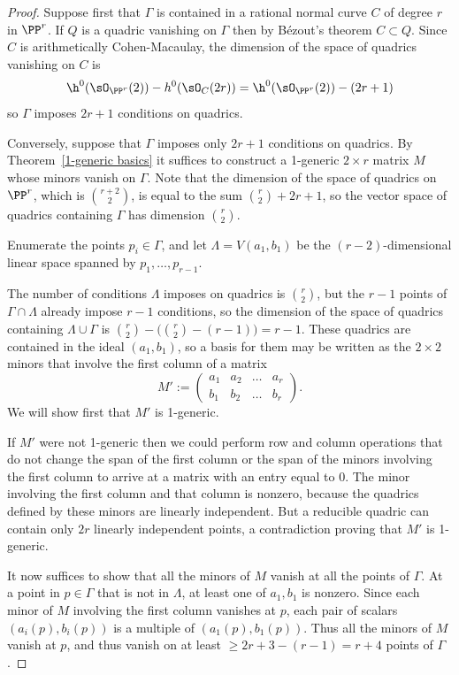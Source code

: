 \begin{proof} Suppose first that $\Gamma$ is contained in a rational normal curve $C$ of degree $r$ in $\PP^{r}$.
If $Q$ is a quadric vanishing on $\Gamma$ then by B\'ezout's theorem $C\subset Q$. Since $C$ is arithmetically
Cohen-Macaulay, the dimension of the space of quadrics vanishing on $C$ is 
$$
\h^{0}(\sO_{\PP^{r}}(2)) - h^{0}(\sO_{C}(2r)) = \h^{0}(\sO_{\PP^{r}}(2)) -(2r+1)
$$
so $\Gamma$ imposes $2r+1$ conditions on quadrics.

Conversely, suppose that $\Gamma$ imposes only $2r+1$ conditions on quadrics.
By Theorem~\ref{1-generic basics} it suffices to construct a 1-generic $2\times r$ matrix $M$ whose minors vanish on
$\Gamma$. Note that the dimension of the space of quadrics on $\PP^r$, which is $\binom{r+2}{2}$, is equal to the sum
$\binom{r}{2}+2r+1$, so the vector space of quadrics containing $\Gamma$ has dimension $\binom{r}{2}$.

Enumerate the points $p_i\in \Gamma$, and let $\Lambda = V(a_1,b_1)$ be the $(r-2)$-dimensional linear
space spanned by $p_1,\dots,p_{r-1}$. 

 The number of
conditions $\Lambda$ imposes on quadrics is $\binom{r}{2}$, but the $r-1$ points of $\Gamma \cap \Lambda$
already impose $r-1$ conditions, so the dimension of the space of quadrics containing $\Lambda\cup \Gamma$
is $\binom{r}{2}-\bigl(\binom{r}{2}-(r-1)\bigr) = r-1.$ These quadrics are contained in the ideal $(a_1,b_1)$, so a
basis for them
may be written as the $2\times 2$ minors that involve the first column of a matrix
$$
M' := \begin{pmatrix}
a_1&a_2&\dots&a_{r}\\
b_1&b_2&\dots&b_{r}
\end{pmatrix}.
$$
We will show first that $M'$ is 1-generic.

If $M'$ were not 1-generic then we could perform row and column operations that do not change the 
span of the first column or the span of the minors involving the first column
 to arrive at a matrix with an entry equal to 0. The minor
involving the first column and that column is nonzero, because the quadrics defined by
these minors are linearly independent. But a reducible quadric can contain
only $2r$ linearly independent points, a contradiction proving that $M'$ is 1-generic.

It now suffices to show that all the minors of $M$ vanish at all the points of $\Gamma$.
At a point in $p\in \Gamma$ that is not in $\Lambda$, at least one of $a_1,b_1$ is nonzero.
Since each minor
of $M$ involving the first column vanishes at $p$, each pair
of scalars $(a_i(p),b_i(p))$ is a multiple of $(a_1(p), b_1(p))$. Thus all the minors
of $M$ vanish at $p$, and thus vanish on at least $\geq 2r+3-(r-1) = r+4$ points of $\Gamma$.


\end{proof}
